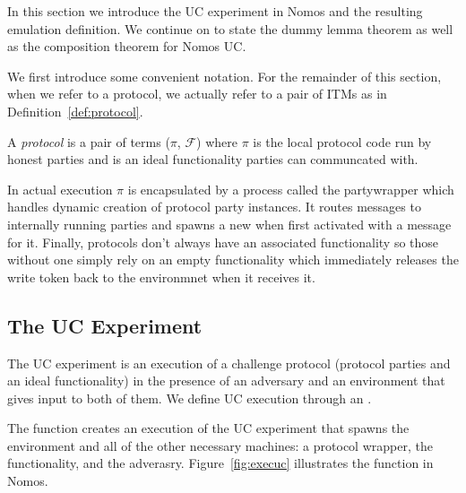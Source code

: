 In this section we introduce the UC experiment in Nomos and the resulting emulation definition.
We continue on to state the dummy lemma theorem as well as the composition theorem for Nomos UC.

We first introduce some convenient notation.
For the remainder of this section, when we refer to a protocol, we actually refer to a pair of ITMs as in Definition~\ref{def:protocol}.
\begin{definition}\label{def:protocol}
A \textit{protocol} is a pair of terms ($\pi$, $\mathcal{F}$) where $\pi$ is the local protocol code run by honest parties and \F is an ideal functionality parties can communcated with.
\end{definition}
In actual execution $\pi$ is encapsulated by a process called the partywrapper which handles dynamic creation of protocol party instances. 
It routes messages to internally running parties and spawns a new  when first activated with a message for it.
Finally, protocols don't always have an associated functionality so those without one simply rely on an empty functionality which immediately releases the write token back to the environmnet when it receives it.

\subsection{The UC Experiment}
The UC experiment is an execution of a challenge protocol (protocol parties and an ideal functionality) in the presence of an adversary and an environment that gives input to both of them.
We define UC execution through an .

The  function creates an execution of the UC experiment that spawns the environment and all of the other necessary machines: a protocol wrapper, the functionality, and the adverasry.
Figure~\ref{fig:execuc} illustrates the function in Nomos.

